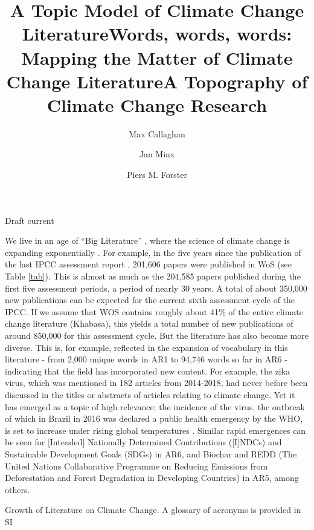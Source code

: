 \documentclass{article}
\title{A Topic Model of Climate Change Literature}
\title{Words, words, words: Mapping the Matter of Climate Change Literature}
\title{A Topography of Climate Change Research}
\author[1,2]{Max Callaghan}
\author[1,2]{Jan Minx}
\author[2]{Piers M. Forster}
\affil[1]{Mercator Research Institute on Global Commons and Climate Change, Torgauer Straße, 10829 Berlin, Germany}
\affil[2]{Priestley International Centre for Climate, University of Leeds, Leeds LS2 9JT, United Kingdom}
\makeatletter
\renewcommand{\maketitle}{\bgroup\setlength{\parindent}{0pt}
	\begin{flushleft}
		
		{\huge\textbf{\@title}}
		
		\bigskip
		
		{\large\textbf{\@author}}
		
		\bigskip
		
		{\large{Draft current \@date}}
		
	\end{flushleft}\egroup
}
\makeatother
\begin{document}
	\maketitle
	
	
	\begin{linenumbers}
		
		\noindent\textbf{}
		
		
		
		\bigskip
		
		\noindent We live in an age of ``Big Literature'' 
		\cite{Nunez-Mir2016, Minx2017}, where the science of climate change is expanding exponentially \cite{Grieneisen2011, Haunschild2016}. For example, in the five years since the publication of the last IPCC assessment report \cite{IPCC2014c}, 201,606 papers were published in WoS (see Table \ref{tab}). This is almost as much as the 204,585 papers published during the first five assessment periods, a period of nearly 30 years. A total of about 350,000 new publications can be expected for the current sixth assessment cycle of the IPCC. If we assume that WOS contains roughly about 41\% of the entire climate change literature (Khabasa), this yields a total number of new publications of around 850,000 for this assessment cycle. But the literature has also become more diverse. This is, for example, reflected in the expansion of vocabulary in this literature - from 2,000 unique words in AR1 to 94,746 words so far in AR6 - indicating that the field has incorporated new content. For example, the zika virus, which was mentioned in 182 articles from 2014-2018, had never before been discussed in the titles or abstracts of articles relating to climate change. Yet it has emerged as a topic of high relevance: the incidence of the virus, the outbreak of which in Brazil in 2016 was declared a public health emergency by the WHO, is set to increase under rising global temperatures \cite{Rao2019}. Similar rapid emergences can be seen for [Intended] Nationally Determined Contributions ([I]NDCs) and Sustainable Development Goals (SDGs) in AR6, and Biochar and REDD (The United Nations Collaborative Programme on Reducing Emissions from Deforestation and Forest Degradation in Developing Countries) in AR5, among others.
		
		
		\begin{table}[htp]
			{\scriptsize
				}
			\caption{Growth of Literature on Climate Change. A glossary of acronyms is provided in SI}
			\label{tab}
		\end{table}
		

\end{linenumbers}
\end{document}
